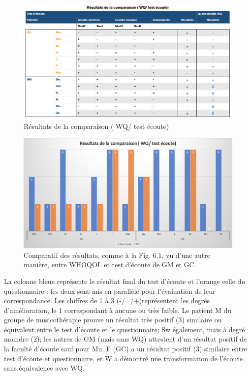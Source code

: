   \begin{figure}
  	\centering
  	\includegraphics[width=\linewidth]{images/graphiques/comparaison_pre_post.png}
  	\caption[Résultats de la comparaison ( WQ/ test écoute)]{Résultats de la comparaison ( WQ/ test 
  	écoute)}
  	
  \end{figure}
  \begin{figure}
  	\centering
  	\includegraphics[width=\linewidth]{images/graphiques/comparatifWQecoute.png}
  	\caption[Comparatif résultats pré/post]{Comparatif des résultats, comme à la  Fig. 6.1, vu d'une autre 
  	manière,
  		entre WHOQOL et test d'écoute de  GM et GC.}
  	
  \end{figure}

 		La colonne bleue représente le résultat final 
du test d'écoute et l'orange celle du questionnaire : les deux sont mis en parallèle 
pour l'évaluation de leur correspondance. Les chiffres de 1 à 3 (-/=/+)représentent les degrés 
d'amélioration, le 1 
correspondant à aucune ou très faible. Le patient M du groupe de musicothérapie prouve un résultat 
très positif (3) similaire ou équivalent entre le test d'écoute et le questionnaire;  Sw également, mais à 
degré 
moindre (2); les autres de GM  (mais sans WQ) attestent d'un résultat positif de la faculté d'écoute 
sauf pour  Mu.  F (GC) a  un résultat positif (3) similaire entre  test d'écoute et questionnaire, 
et W a démontré une 
transformation de l'écoute sans équivalence avec WQ.
   \clearpage
  
